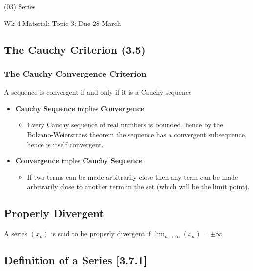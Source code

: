 \documentclass[class=article, crop=false]{standalone}
\begin{document}
\tableofcontents

(03) Series

Wk 4 Material; Topic 3; Due 28 March


\hypertarget{header-n3124}{%
\subsection{The Cauchy Criterion (3.5)}\label{header-n3124}}

\hypertarget{header-n3125}{%
\subsubsection{The Cauchy Convergence Criterion}\label{header-n3125}}

A sequence is convergent if and only if it is a Cauchy sequence

\begin{itemize}
\item
  \textbf{Cauchy Sequence} implies \textbf{Convergence}

  \begin{itemize}
  \item
    Every Cauchy sequence of real numbers is bounded, hence by the
    Bolzano-Weierstrass theorem the sequence has a convergent
    subsequence, hence is itself convergent.
  \end{itemize}
\item
  \textbf{Convergence} imples \textbf{Cauchy Sequence}

  \begin{itemize}
  \item
    If two terms can be made arbitrarily close then any term can be made
    arbitrarily close to another term in the set (which will be the
    limit point).
  \end{itemize}
\end{itemize}

\hypertarget{header-n3138}{%
\subsection{Properly Divergent}\label{header-n3138}}

A series \((x_n)\) is said to be properly divergent if
\(\lim_{n\rightarrow \infty}(x_n) = \pm \infty\)

\hypertarget{header-n3140}{%
	\newpage
\subsection{Definition of a Series {[}3.7.1{]}}\label{header-n3140}}
\end{document}

